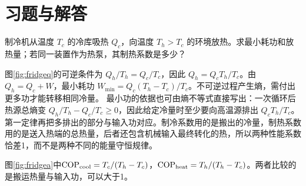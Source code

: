 


\section{习题与解答}
\begin{exercise}[可逆制冷机的功与制热量]
\enlargethispage{\baselineskip}
制冷机从温度 $T_c$ 的冷库吸热 $Q_c$，向温度 $T_h>T_c$ 的环境放热。求最小耗功和放热量；若同一装置作为热泵，其制热系数是多少？
\end{exercise}
\begin{solution}
图\ref{fig:fridgeq}的可逆条件为 $Q_h/T_h=Q_c/T_c$，因此 $Q_h=Q_cT_h/T_c$。由 $Q_h=Q_c+W$，最小耗功 $W_{\min}=Q_c(T_h-T_c)/T_c$。不可逆过程产生熵，需付出更多功才能转移相同冷量。
最小功的依据也可由熵不等式直接写出：一次循环后热源总熵变 $Q_h/T_h-Q_c/T_c\ge0$，因此给定冷量时至少要向高温源排出 $Q_cT_h/T_c$。第一定律再把多排出的部分与输入功对应。制冷系数用的是搬出的冷量，制热系数用的是送入热端的总热量，后者还包含机械输入最终转化的热，所以两种性能系数恰差1，而不是两种不同的能量守恒规律。

图\ref{fig:fridgea}中$\mathrm{COP}_{\rm cool}=T_c/(T_h-T_c)$，$\mathrm{COP}_{\rm heat}=T_h/(T_h-T_c)$。两者比较的是搬运热量与输入功，可以大于1。
\end{solution}

